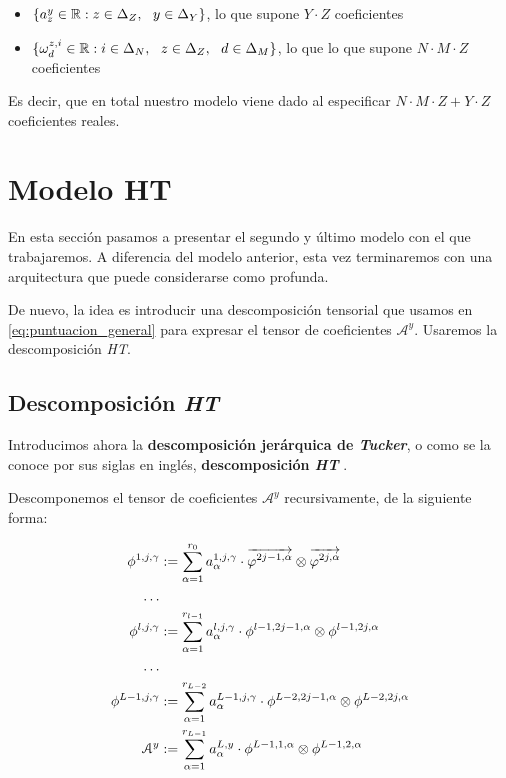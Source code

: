 \begin{itemize}
    \item $\{a_z^y \in \mathbb{R} : z \in \Delta_{Z}, \ \  y \in \Delta_{Y}\}$, lo que supone $Y \cdot Z$ coeficientes
    \item $\{\omega_d^{z, i} \in \mathbb{R}: i \in \Delta_{N}, \ \  z \in \Delta_{Z}, \ \  d \in \Delta_{M}\}$, lo que lo que supone $N \cdot M \cdot Z$ coeficientes
\end{itemize}

Es decir, que en total nuestro modelo viene dado al especificar $N \cdot M \cdot Z + Y \cdot Z$ coeficientes reales.

\section{Modelo HT} \label{sec:modelo_ht}

En esta sección pasamos a presentar el segundo y último modelo con el que trabajaremos. A diferencia del modelo anterior, esta vez terminaremos con una arquitectura que puede considerarse como profunda.

De nuevo, la idea es introducir una descomposición tensorial que usamos en \eqref{eq:puntuacion_general} para expresar el tensor de coeficientes $\mathcal{A}^y$. Usaremos la descomposición \textit{HT}.

\subsection{Descomposición \textit{HT}}

Introducimos ahora la \textbf{descomposición jerárquica de \textit{Tucker}}, o como se la conoce por sus siglas en inglés, \textbf{descomposición \textit{HT}} \cite{matematicas:descomposicion_ht} \cite{matematicas:principal}.

Descomponemos el tensor de coeficientes $\mathcal{A}^y$ recursivamente, de la siguiente forma:

\begin{equation} \label{eq:descomposicion_ht}
\begin{split}
    \phi^{1, j, \gamma} &:= \sum_{\alpha = 1}^{r_0} a_{\alpha}^{1, j, \gamma} \cdot \overrightarrow{\varphi^{2j-1, \alpha}} \otimes \overrightarrow{\varphi^{2j, \alpha}} \\
    \ldots \\
    \phi^{l, j, \gamma} &:= \sum_{\alpha = 1}^{r_{l-1}} a_{\alpha}^{l, j, \gamma} \cdot \phi^{l-1, 2j-1, \alpha} \otimes \phi^{l-1, 2j, \alpha} \\
    \ldots \\
    \phi^{L - 1, j, \gamma} &:= \sum_{\alpha = 1}^{r_{L-2}} a_{\alpha}^{L - 1, j, \gamma} \cdot \phi^{L-2, 2j-1, \alpha} \otimes \phi^{L-2, 2j, \alpha} \\
    \mathcal{A}^y &:= \sum_{\alpha = 1}^{r_{L-1}} a_{\alpha}^{L, y} \cdot \phi^{L-1, 1, \alpha} \otimes \phi^{L-1, 2, \alpha}
\end{split}
\end{equation}

